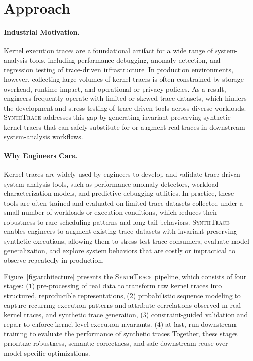 \section{Approach}
\label{sec:approach}
\paragraph{Industrial Motivation.}
Kernel execution traces are a foundational artifact for a wide range of system-analysis tools, including performance debugging, anomaly detection, and regression testing of trace-driven infrastructure. In production environments, however, collecting large volumes of kernel traces is often constrained by storage overhead, runtime impact, and operational or privacy policies. As a result, engineers frequently operate with limited or skewed trace datasets, which hinders the development and stress-testing of trace-driven tools across diverse workloads. \textsc{SynthTrace} addresses this gap by generating invariant-preserving synthetic kernel traces that can safely substitute for or augment real traces in downstream system-analysis workflows.

\paragraph{Why Engineers Care.}
Kernel traces are widely used by engineers to develop and validate trace-driven system analysis tools, such as performance anomaly detectors, workload characterization models, and predictive debugging utilities. In practice, these tools are often trained and evaluated on limited trace datasets collected under a small number of workloads or execution conditions, which reduces their robustness to rare scheduling patterns and long-tail behaviors. \textsc{SynthTrace} enables engineers to augment existing trace datasets with invariant-preserving synthetic executions, allowing them to stress-test trace consumers, evaluate model generalization, and explore system behaviors that are costly or impractical to observe repeatedly in production.

Figure~\ref{fig:architecture} presents the \textsc{SynthTrace} pipeline, which consists of four stages:
(1) pre-processing of real data to transform raw kernel traces into structured, reproducible representations,
(2) probabilistic sequence modeling to capture recurring execution patterns and attribute correlations observed in real kernel traces, and synthetic trace generation,
(3) constraint-guided validation and repair to enforce kernel-level execution invariants.
(4) at last, run downstream training to evaluate the performance of synthetic traces
Together, these stages prioritize robustness, semantic correctness, and safe downstream reuse over model-specific optimizations.



